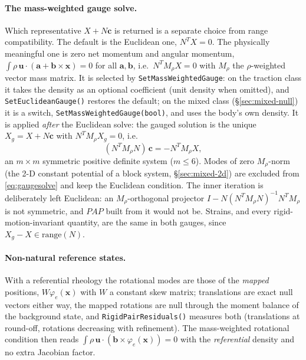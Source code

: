 \documentclass[11pt]{article}
\numberwithin{equation}{section}
\theoremstyle{remark}
\newcommand{\vu}{\mathbf{u}}
\newcommand{\vx}{\mathbf{x}}
\newcommand{\code}[1]{\texttt{#1}}
\begin{document}
\paragraph{The mass-weighted gauge solve.} Which representative
$X + N\mathbf{c}$ is returned is a separate choice from range
compatibility. The default is the Euclidean one, $N^TX = 0$. The physically
meaningful one is zero net momentum and angular momentum,
$\int\rho\,\vu\cdot(\mathbf{a} + \mathbf{b}\times\vx) = 0$ for all
$\mathbf{a},\mathbf{b}$, i.e.\ $N^T M_\rho X = 0$ with $M_\rho$ the
$\rho$-weighted vector mass matrix. It is selected by
\code{SetMassWeightedGauge}: on the traction class it takes the density as
an optional coefficient (unit density when omitted), and
\code{SetEuclideanGauge()} restores the default; on the mixed class
(\S\ref{sec:mixed-null}) it is a switch, \code{SetMassWeightedGauge(bool)},
and uses the body's own density. It is
applied \emph{after} the Euclidean solve: the gauged solution is the unique
$X_g = X + N\mathbf{c}$ with $N^TM_\rho X_g = 0$, i.e.
\begin{equation}
  (N^TM_\rho N)\,\mathbf{c} = -N^TM_\rho X ,
  \label{eq:gaugesolve}
\end{equation}
an $m\times m$ symmetric positive definite system ($m\le6$). Modes of
zero $M_\rho$-norm (the 2-D constant potential of a block system,
\S\ref{sec:mixed-2d}) are excluded from \eqref{eq:gaugesolve} and keep the
Euclidean condition. The inner iteration is deliberately left Euclidean:
an $M_\rho$-orthogonal projector $I - N(N^TM_\rho N)^{-1}N^TM_\rho$ is not
symmetric, and $PAP$ built from it would not be. Strains, and every
rigid-motion-invariant quantity, are the same in both gauges, since $X_g -
X\in\mathrm{range}(N)$.

\paragraph{Non-natural reference states.} With a referential rheology the
rotational modes are those of the \emph{mapped} positions,
$W\varphi_e(\vx)$ with $W$ a constant skew matrix; translations are exact null vectors either
way, the mapped rotations are null through the moment balance of the
background state, and \code{RigidPairResiduals()} measures both
(translations at round-off, rotations decreasing with refinement). The
mass-weighted rotational condition then reads $\int\rho\,\vu\cdot
(\mathbf{b}\times\varphi_e(\vx)) = 0$ with the \emph{referential} density
and no extra Jacobian factor.
\end{document}

